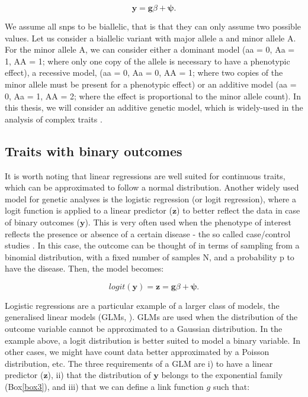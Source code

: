 \begin{equation}\label{eq:Linear_regression_genetics}
 \mathbf{y} = \mathbf{g}\beta + \boldsymbol{\psi}. 
\end{equation}

We assume all \gls{snp}s to be biallelic, that is that they can only assume two possible values. 
Let us consider a biallelic variant with major allele a and minor allele A. For the minor allele A, we can consider either a dominant model (aa = 0, Aa = 1, AA = 1; where only one copy of the allele is necessary to have a phenotypic effect), a recessive model, (aa = 0, Aa = 0, AA = 1; where two copies of the minor allele must be present for a phenotypic effect) or an additive model (aa = 0, Aa = 1, AA = 2; where the effect is proportional to the minor allele count). 
In this thesis, we will consider an additive genetic model, which is widely-used in the analysis of complex traits \cite{laird2010fundamentals}.

\subsection{Traits with binary outcomes}

It is worth noting that linear regressions are well suited for continuous traits, which can be approximated to follow a normal distribution. 
Another widely used model for genetic analyses is the logistic regression (or logit regression), where a logit function is applied to a linear predictor ($\mathbf{z}$) to better reflect the data in case of binary outcomes ($\mathbf{y}$). 
This is very often used when the phenotype of interest reflects the presence or absence of a certain disease - the so called case/control studies \cite{chen2001general,clayton2013statistical}.
In this case, the outcome can be thought of in terms of sampling from a binomial distribution, with a fixed number of samples N, and a probability p to have the disease. 
Then, the model becomes:

\begin{equation}\label{eq:Logistic_regression_genetics_z}
 logit(\mathbf{y}) = \mathbf{z} = \mathbf{g}\beta + \boldsymbol{\psi}. 
\end{equation}

Logistic regressions are a particular example of a larger class of models, the generalised linear models (GLMs, \cite{mccullagh2018generalized}). 
GLMs are used when the distribution of the outcome variable cannot be approximated to a Gaussian distribution. 
In the example above, a logit distribution is better suited to model a binary variable. 
In other cases, we might have count data better approximated by a Poisson distribution, etc.
The three requirements of a GLM are i) to have a linear predictor ($\mathbf{z}$), ii) that the distribution of $\mathbf{y}$  belongs to the exponential family (Box\ref{box3}), and iii) that we can define a link function $g$ such that:

